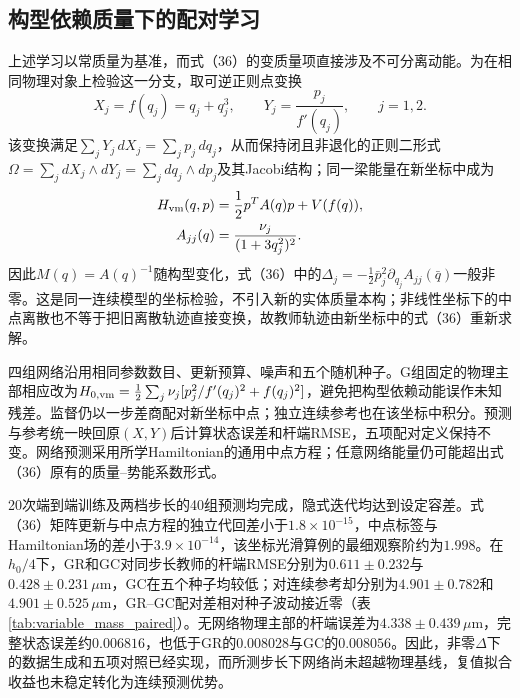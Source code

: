\subsection{构型依赖质量下的配对学习}
\label{sec:variable_mass_learning}

上述学习以常质量为基准，而式（36）的变质量项直接涉及不可分离动能。为在相同物理对象上检验这一分支，取可逆正则点变换
\[
 X_j=f(q_j)=q_j+q_j^3,\qquad
 Y_j=\frac{p_j}{f'(q_j)},\qquad j=1,2.
\]
该变换满足$\sum_jY_j\,dX_j=\sum_jp_j\,dq_j$，从而保持闭且非退化的正则二形式$\Omega=\sum_jdX_j\wedge dY_j=\sum_jdq_j\wedge dp_j$及其Jacobi结构；同一梁能量在新坐标中成为
\[
 \begin{aligned}
 H_{\rm vm}(q,p)&=\frac12p^TA(q)p+V(f(q)),\\
 A_{jj}(q)&=\frac{\nu_j}{(1+3q_j^2)^2}.
 \end{aligned}
\]
因此$M(q)=A(q)^{-1}$随构型变化，式（36）中的$\Delta_j=-\tfrac12\bar p_j^2\partial_{q_j}A_{jj}(\bar q)$一般非零。这是同一连续模型的坐标检验，不引入新的实体质量本构；非线性坐标下的中点离散也不等于把旧离散轨迹直接变换，故教师轨迹由新坐标中的式（36）重新求解。

四组网络沿用相同参数数目、更新预算、噪声和五个随机种子。G组固定的物理主部相应改为$H_{0,\rm vm}=\tfrac12\sum_j\nu_j[p_j^2/f'(q_j)^2+f(q_j)^2]$，避免把构型依赖动能误作未知残差。监督仍以一步差商配对新坐标中点；独立连续参考也在该坐标中积分。预测与参考统一映回原$(X,Y)$后计算状态误差和杆端RMSE，五项配对定义保持不变。网络预测采用所学Hamiltonian的通用中点方程；任意网络能量仍可能超出式（36）原有的质量--势能系数形式。



20次端到端训练及两档步长的40组预测均完成，隐式迭代均达到设定容差。式（36）矩阵更新与中点方程的独立代回差小于$1.8\times10^{-15}$，中点标签与Hamiltonian场的差小于$3.9\times10^{-14}$，该坐标光滑算例的最细观察阶约为$1.998$。在$h_0/4$下，GR和GC对同步长教师的杆端RMSE分别为$0.611\pm0.232$与$0.428\pm0.231\,\mu\mathrm m$，GC在五个种子均较低；对连续参考却分别为$4.901\pm0.782$和$4.901\pm0.525\,\mu\mathrm m$，GR--GC配对差相对种子波动接近零（表\ref{tab:variable_mass_paired}）。无网络物理主部的杆端误差为$4.338\pm0.439\,\mu\mathrm m$，完整状态误差约$0.006816$，也低于GR的$0.008028$与GC的$0.008056$。因此，非零$\Delta$下的数据生成和五项对照已经实现，而所测步长下网络尚未超越物理基线，复值拟合收益也未稳定转化为连续预测优势。
